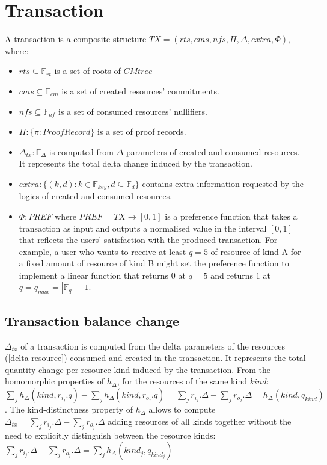 \section{Transaction}

A transaction is a composite structure $TX = (rts, cms, nfs, \Pi, \Delta, extra, \Phi)$, where:
\begin{itemize}
    \item $rts \subseteq \mathbb{F}_{rt}$ is a set of roots of $CMtree$
    \item $cms \subseteq  \mathbb{F}_{cm}$ is a set of created resources' commitments. 
    \item $nfs \subseteq \mathbb{F}_{nf}$ is a set of consumed resources' nullifiers.
    \item $\Pi: \{ \pi: ProofRecord\}$ is a set of proof records.
    \item $\Delta_{tx}: \mathbb{F}_{\Delta}$ is computed from $\Delta$ parameters of created and consumed resources. It represents the total delta change induced by the transaction.
    \item $extra: \{(k, d): k \in \mathbb{F}_{key}, d \subseteq \mathbb{F}_{d}\}$ contains extra information requested by the logics of created and consumed resources.
    \item $\Phi: PREF$ where $PREF = TX \rightarrow [0, 1]$ is a preference function that takes a transaction as input and outputs a normalised value in the interval $[0,1]$ that reflects the users' satisfaction with the produced transaction. For example, a user who wants to receive at least $q=5$ of resource of kind A for a fixed amount of resource of kind B might set the preference function to implement a linear function that returns $0$ at $q=5$ and returns $1$ at $q = q_{max} = |\mathbb{F}_q| - 1$.
\end{itemize}

\subsection{Transaction balance change}

$\Delta_{tx}$ of a transaction is computed from the delta parameters of the resources (\ref{delta-resource}) consumed and created in the transaction. It represents the total quantity change per resource kind induced by the transaction. From the homomorphic properties of $h_\Delta$, for the resources of the same kind $kind$: $\sum_j{h_\Delta(kind, r_{i_j}.q)} - \sum_j{h_\Delta(kind, r_{o_j}.q)} = \sum_j{r_{i_j}.\Delta} - \sum_j{r_{o_j}.\Delta} =  h_\Delta(kind, q_{kind})$. The kind-distinctness property of $h_\Delta$ allows to compute $\Delta_{tx} = \sum_j{r_{i_j}.\Delta} - \sum_j{r_{o_j}.\Delta}$ adding resources of all kinds together without the need to explicitly distinguish between the resource kinds: $\sum_j{r_{i_j}.\Delta} - \sum_j{r_{o_j}.\Delta} = \sum_j{h_\Delta(kind_j, q_{kind_j})}$

